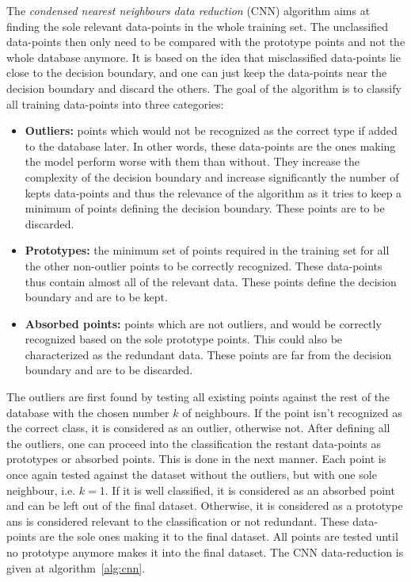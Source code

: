 The \emph{condensed nearest neighbours data reduction} (CNN) algorithm aims at finding the sole relevant data-points in the whole training set. The unclassified data-points then only need to be compared with the prototype points and not the whole database anymore. It is based on the idea that misclassified data-points lie close to the decision boundary, and one can just keep the data-points near the decision boundary and discard the others. The goal of the algorithm is to classify all training data-points into three categories:
\begin{itemize}
    \item \textbf{Outliers:} points which would not be recognized as the correct type if added to the database later. In other words, these data-points are the ones making the model perform worse with them than without. They increase the complexity of the decision boundary and increase significantly the number of kepts data-points and thus the relevance of the algorithm as it tries to keep a minimum of points defining the decision boundary. These points are to be discarded.
    \item \textbf{Prototypes:} the minimum set of points required in the training set for all the other non-outlier points to be correctly recognized. These data-points thus contain almost all of the relevant data. These points define the decision boundary and are to be kept.
    \item \textbf{Absorbed points:} points which are not outliers, and would be correctly recognized based on the sole prototype points. This could also be characterized as the redundant data. These points are far from the decision boundary and are to be discarded.
\end{itemize}

The outliers are first found by testing all existing points against the rest of the database with the chosen number $k$ of neighbours. If the point isn't recognized as the correct class, it is considered as an outlier, otherwise not. After defining all the outliers, one can proceed into the classification the restant data-points as prototypes or absorbed points. This is done in the next manner. Each point is once again tested against the dataset without the outliers, but with one sole neighbour, i.e. $k=1$. If it is well classified, it is considered as an absorbed point and can be left out of the final dataset. Otherwise, it is considered as a prototype ans is considered relevant to the classification or not redundant. These data-points are the sole ones making it to the final dataset. All points are tested until no prototype anymore makes it into the final dataset. The CNN data-reduction is given at algorithm~\ref{alg:cnn}.

